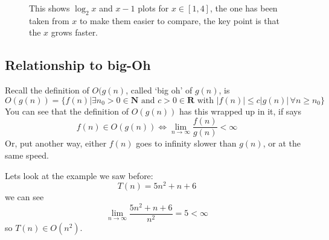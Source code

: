 \documentclass[11pt,a4paper]{scrartcl}
\begin{document}
\begin{figure}

\caption{This shows $\log_2{x}$ and $x-1$ plots for $x\in[1,4]$, the one has been taken from $x$ to make them easier to compare, the key point is that the $x$ grows faster.\label{fig_log}}
\end{figure}


\subsection*{Relationship to big-Oh}

Recall the definition of $O(g(n)$, called \lq{}big oh\rq{} of
$g(n)$, is
\begin{equation}
O(g(n))=\{f(n)| \exists n_0>0\in \mathbf{ N}\mbox{ and }c>0\in \mathbf{R}\mbox{ with }|f(n)|\le c|g(n)|\,\forall n\ge n_0\}
\end{equation}
You can see that the definition of $O(g(n))$ has this wrapped up in
it, if says
\begin{equation}
f(n)\in O(g(n))\iff \lim_{n\rightarrow \infty}\frac{f(n)}{g(n)}<\infty
\end{equation}
Or, put another way, either $f(n)$ goes to infinity slower than
$g(n)$, or at the same speed.

Lets look at the example we saw before:
\begin{equation}
T(n)=5n^2+n+6
\end{equation}
we can see
\begin{equation}
\lim_{n\rightarrow \infty}\frac{5n^2+n+6}{n^2}=5<\infty
\end{equation}
so $T(n)\in O(n^2)$.
\end{document}
